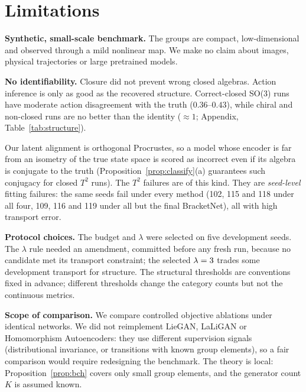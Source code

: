\section{Limitations}\label{sec:limits}
\textbf{Synthetic, small-scale benchmark.} The groups are compact, low-dimensional and observed through a mild
nonlinear map. We make no claim about images, physical trajectories or large pretrained models.

\textbf{No identifiability.} Closure did not prevent wrong closed algebras. Action inference is only as good as
the recovered structure. Correct-closed SO(3) runs have moderate action disagreement with the truth
($0.36$--$0.43$), while chiral and non-closed runs are no better than the identity ($\approx1$; Appendix,
Table~\ref{tab:structure}).

Our latent alignment is orthogonal Procrustes, so a model whose encoder is far from an isometry of the true state
space is scored as incorrect even if its algebra is conjugate to the truth (Proposition~\ref{prop:classify}(a)
guarantees such conjugacy for closed $T^2$ runs). The $T^2$ failures are of this kind. They are \emph{seed-level}
fitting failures: the same seeds fail under every method (102, 115 and 118 under all four, 109, 116 and 119 under
all but the final BracketNet), all with high transport error.

\textbf{Protocol choices.} The budget and $\lambda$ were selected on five development seeds. The $\lambda$ rule
needed an amendment, committed before any fresh run, because no candidate met its transport constraint; the
selected $\lambda=3$ trades some development transport for structure. The structural thresholds are
conventions fixed in advance; different thresholds change the category counts but not the continuous metrics.

\textbf{Scope of comparison.} We compare controlled objective ablations under identical networks. We did not
reimplement LieGAN, LaLiGAN or Homomorphism Autoencoders: they use different supervision signals (distributional
invariance, or transitions with known group elements), so a fair comparison would require redesigning the
benchmark. The theory is local: Proposition~\ref{prop:bch} covers only small group elements, and the generator
count $K$ is assumed known.


